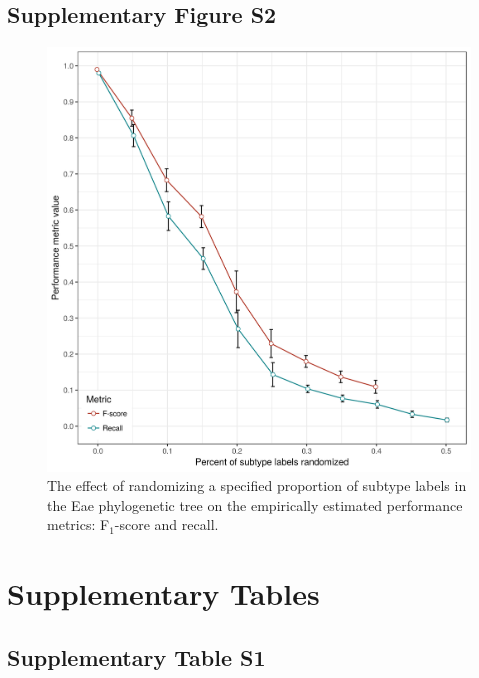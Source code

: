 \documentclass[11pt,letterpaper]{article}
\begin{document}
\clearpage

\subsection{Supplementary Figure S2}

\begin{figure}[h!]
\centering
\includegraphics[scale=0.5]{sfig02.png}
\caption{The effect of randomizing a specified proportion of subtype labels in the Eae phylogenetic tree on the empirically estimated performance metrics: F$_1$-score and recall.}
\end{figure}

\clearpage

\section{Supplementary Tables}

\subsection{Supplementary Table S1}

~
\end{document}

